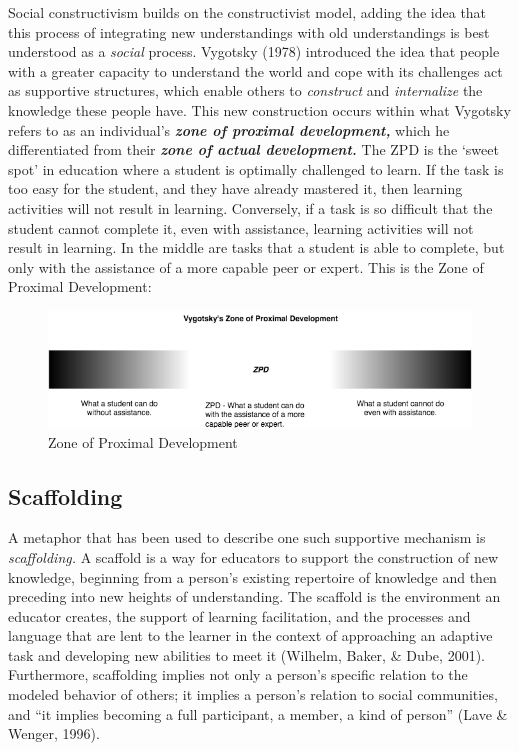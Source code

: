 \documentclass[
]{book}
\begin{document}
Social constructivism builds on the constructivist model, adding the idea that this process of integrating new understandings with old understandings is best understood as a \emph{social} process. Vygotsky (1978) introduced the idea that people with a greater capacity to understand the world and cope with its challenges act as supportive structures, which enable others to \emph{construct} and \emph{internalize} the knowledge these people have. This new construction occurs within what Vygotsky refers to as an individual's \textbf{\emph{zone of proximal development,}} which he differentiated from their \textbf{\emph{zone of actual development.}} The ZPD is the `sweet spot' in education where a student is optimally challenged to learn. If the task is too easy for the student, and they have already mastered it, then learning activities will not result in learning. Conversely, if a task is so difficult that the student cannot complete it, even with assistance, learning activities will not result in learning. In the middle are tasks that a student is able to complete, but only with the assistance of a more capable peer or expert. This is the Zone of Proximal Development:

\begin{figure}
\centering
\includegraphics{assets/u3/ZPD_Image.png}
\caption{Zone of Proximal Development}
\end{figure}

\hypertarget{scaffolding}{%
\subsection*{Scaffolding}\label{scaffolding}}

A metaphor that has been used to describe one such supportive mechanism is \emph{scaffolding.} A scaffold is a way for educators to support the construction of new knowledge, beginning from a person's existing repertoire of knowledge and then preceding into new heights of understanding. The scaffold is the environment an educator creates, the support of learning facilitation, and the processes and language that are lent to the learner in the context of approaching an adaptive task and developing new abilities to meet it (Wilhelm, Baker, \& Dube, 2001). Furthermore, scaffolding implies not only a person's specific relation to the modeled behavior of others; it implies a person's relation to social communities, and ``it implies becoming a full participant, a member, a kind of person'' (Lave \& Wenger, 1996).
\end{document}
